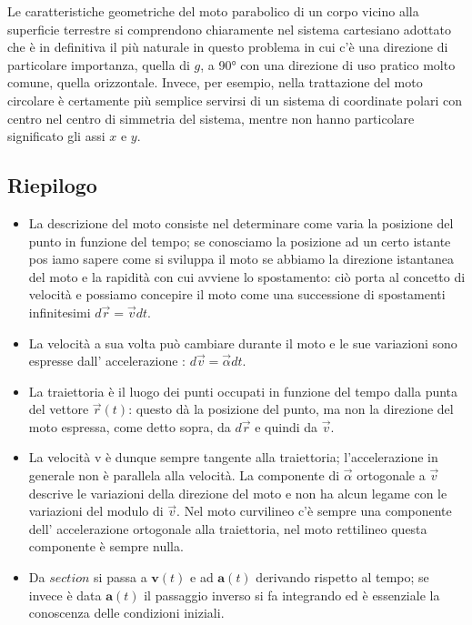 \documentclass[class=book, crop=false, oneside, 12pt]{standalone}
\begin{document}
Le caratteristiche geometriche del moto parabolico di un corpo vicino alla superficie terrestre si comprendono chiaramente nel sistema cartesiano adottato che è in definitiva il più naturale in questo problema in cui c'è una direzione di particolare importanza, 
quella di \(g\), a 90° con una direzione di uso pratico molto comune, quella orizzontale. 
Invece, per esempio, nella trattazione del moto circolare è certamente più semplice servirsi di un sistema di coordinate polari con centro nel centro di simmetria del sistema, mentre non hanno particolare significato gli assi \(x\) e \(y\).

\subsection{Riepilogo}

\begin{itemize}
  \item La descrizione del moto consiste nel determinare come varia la posizione del punto in funzione del tempo; se conosciamo la posizione ad un certo istante pos iamo sapere come si sviluppa il moto se abbiamo la direzione istantanea del moto e la rapidità con cui avviene lo spostamento: ciò porta al concetto di velocità e possiamo concepire il moto come una successione di spostamenti infinitesimi \(d \overrightarrow{r}= \overrightarrow{v} dt\).
  \item La velocità a sua volta può cambiare durante il moto e le sue variazioni sono espresse dall' accelerazione : \(d \overrightarrow{v} = \overrightarrow{\alpha} d t\).
  \item La traiettoria è il luogo dei punti occupati in funzione del tempo dalla punta del vettore \(\overrightarrow{r}(t)\): questo dà la posizione del punto, ma non la direzione del moto espressa, come detto sopra, da \(d \overrightarrow{r}\) e quindi da \(\overrightarrow{v}\). 
  \item La velocità v è dunque sempre tangente alla traiettoria; l'accelerazione in generale non è parallela alla velocità. La componente di \(\overrightarrow{\alpha}\) ortogonale a \(\overrightarrow{v}\) descrive le variazioni della direzione del moto e non ha alcun legame con le variazioni del modulo di \(\overrightarrow{v}\). Nel moto curvilineo c'è sempre una componente dell' accelerazione ortogonale alla traiettoria, nel moto rettilineo questa componente è sempre nulla. 
  \item Da \(section\) si passa a \(\boldsymbol{v}(t)\) e ad \(\boldsymbol{a}(t)\) derivando rispetto al tempo; se invece è data \(\boldsymbol{a}(t)\) il passaggio inverso si fa integrando ed è essenziale la conoscenza delle condizioni iniziali. 

\end{itemize}
\end{document}
